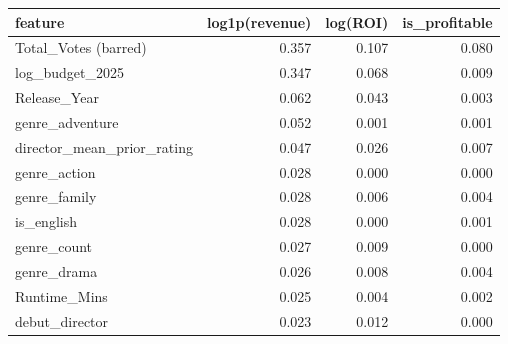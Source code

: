 \begin{tabular}{lrrr}
\toprule
feature & log1p(revenue) & log(ROI) & is\_profitable \\
\midrule
Total\_Votes (barred) & 0.357 & 0.107 & 0.080 \\
log\_budget\_2025 & 0.347 & 0.068 & 0.009 \\
Release\_Year & 0.062 & 0.043 & 0.003 \\
genre\_adventure & 0.052 & 0.001 & 0.001 \\
director\_mean\_prior\_rating & 0.047 & 0.026 & 0.007 \\
genre\_action & 0.028 & 0.000 & 0.000 \\
genre\_family & 0.028 & 0.006 & 0.004 \\
is\_english & 0.028 & 0.000 & 0.001 \\
genre\_count & 0.027 & 0.009 & 0.000 \\
genre\_drama & 0.026 & 0.008 & 0.004 \\
Runtime\_Mins & 0.025 & 0.004 & 0.002 \\
debut\_director & 0.023 & 0.012 & 0.000 \\
\bottomrule
\end{tabular}
